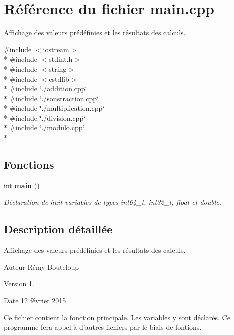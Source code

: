\section{Référence du fichier main.\-cpp}
\label{main_8cpp}


Affichage des valeurs prédéfinies et les résultats des calculs.  


{\ttfamily \#include $<$iostream$>$}\\*
{\ttfamily \#include $<$stdint.\-h$>$}\\*
{\ttfamily \#include $<$string$>$}\\*
{\ttfamily \#include $<$cstdlib$>$}\\*
{\ttfamily \#include \char`\"{}./addition.\-cpp\char`\"{}}\\*
{\ttfamily \#include \char`\"{}./soustraction.\-cpp\char`\"{}}\\*
{\ttfamily \#include \char`\"{}./multiplication.\-cpp\char`\"{}}\\*
{\ttfamily \#include \char`\"{}./division.\-cpp\char`\"{}}\\*
{\ttfamily \#include \char`\"{}./modulo.\-cpp\char`\"{}}\\*
\subsection*{Fonctions}
\begin{DoxyCompactItemize}
\item 
int {\bf main} ()
\begin{DoxyCompactList}\small\item\em Déclaration de huit variables de types int64\-\_\-t, int32\-\_\-t, float et double. \end{DoxyCompactList}\end{DoxyCompactItemize}


\subsection{Description détaillée}
Affichage des valeurs prédéfinies et les résultats des calculs. \begin{DoxyAuthor}{Auteur}
Rémy Bouteloup 
\end{DoxyAuthor}
\begin{DoxyVersion}{Version}
1. 
\end{DoxyVersion}
\begin{DoxyDate}{Date}
12 février 2015
\end{DoxyDate}
Ce fichier contient la fonction principale. Les variables y sont déclarés. Ce programme fera appel à d'autres fichiers par le biais de fontions.

